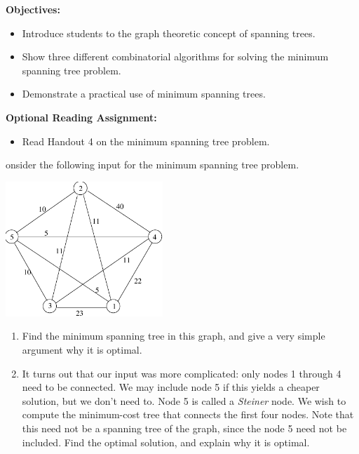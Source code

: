 \documentclass[twoside]{article}%
\begin{document}

\noindent
\textbf{Objectives:}
\begin{itemize}
\item Introduce students to the graph theoretic concept of spanning
  trees.
\item Show three different combinatorial algorithms for solving the
  minimum spanning tree problem.
\item Demonstrate a practical use of minimum spanning trees.
\end{itemize}


\noindent 
\textbf{Optional Reading Assignment:}
\begin{itemize}
\item
Read Handout 4 on the minimum spanning tree problem.
\end{itemize}

onsider the following input for the minimum spanning tree
problem.

\begin{center}
\includegraphics[height= 2in]{prelab3_fig.pdf}
\end{center}

\begin{enumerate}
\item
Find the minimum spanning tree in this graph, and give a very simple
argument why it is optimal.
\item
It turns out that our input was more complicated: only nodes 1 through
4 need to be connected. We may include node 5 if this yields a cheaper
solution, but we don't need to. Node 5 is called a {\it Steiner} node.
We wish to compute the minimum-cost tree that connects the first four
nodes. Note that this need not be a spanning tree of the graph, since
the node 5 need not be included. Find the optimal solution, and
explain why it is optimal.
\end{enumerate}
\end{document}
